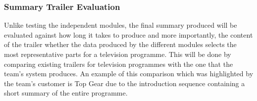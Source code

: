 \subsubsection{Summary Trailer Evaluation}
Unlike testing the independent modules, the final summary produced will be evaluated against how long it takes to produce and 
more importantly, the content of the trailer whether the data produced by the different modules selects the most 
representative parts for a television programme. This will be done by comparing existing trailers for television programmes 
with the one that the team's system produces. An example of this comparison which was highlighted by the team's customer is Top Gear due to the 
introduction sequence containing a short summary of the entire programme.